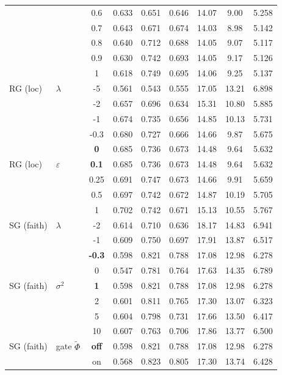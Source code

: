 \begin{longtable}{@{}l l c c c c c c c@{}}
 &  & 0.6 & 0.633 & 0.651 & 0.646 & 14.07 & 9.00 & 5.258 \\
 &  & 0.7 & 0.643 & 0.671 & 0.674 & 14.03 & 8.98 & 5.142 \\
 &  & 0.8 & 0.640 & 0.712 & 0.688 & 14.05 & 9.07 & 5.117 \\
 &  & 0.9 & 0.630 & 0.742 & 0.693 & 14.05 & 9.17 & 5.126 \\
 &  & 1 & 0.618 & 0.749 & 0.695 & 14.06 & 9.25 & 5.137 \\
\midrule
RG (loc) & $\lambda$ & {-}5 & 0.561 & 0.543 & 0.555 & 17.05 & 13.21 & 6.898 \\
 &  & {-}2 & 0.657 & 0.696 & 0.634 & 15.31 & 10.80 & 5.885 \\
 &  & {-}1 & 0.674 & 0.735 & 0.656 & 14.85 & 10.13 & 5.731 \\
 &  & {-}0.3 & 0.680 & 0.727 & 0.666 & 14.66 & 9.87 & 5.675 \\
 &  & \textbf{0} & 0.685 & 0.736 & 0.673 & 14.48 & 9.64 & 5.632 \\
\midrule
RG (loc) & $\varepsilon$ & \textbf{0.1} & 0.685 & 0.736 & 0.673 & 14.48 & 9.64 & 5.632 \\
 &  & 0.25 & 0.691 & 0.747 & 0.673 & 14.66 & 9.91 & 5.659 \\
 &  & 0.5 & 0.697 & 0.742 & 0.672 & 14.87 & 10.19 & 5.705 \\
 &  & 1 & 0.702 & 0.742 & 0.671 & 15.13 & 10.55 & 5.767 \\
\midrule
SG (faith) & $\lambda$ & {-}2 & 0.614 & 0.710 & 0.636 & 18.17 & 14.83 & 6.941 \\
 &  & {-}1 & 0.609 & 0.750 & 0.697 & 17.91 & 13.87 & 6.517 \\
 &  & \textbf{{-}0.3} & 0.598 & 0.821 & 0.788 & 17.08 & 12.98 & 6.278 \\
 &  & 0 & 0.547 & 0.781 & 0.764 & 17.63 & 14.35 & 6.789 \\
\midrule
SG (faith) & $\sigma^2$ & \textbf{1} & 0.598 & 0.821 & 0.788 & 17.08 & 12.98 & 6.278 \\
 &  & 2 & 0.601 & 0.811 & 0.765 & 17.30 & 13.07 & 6.323 \\
 &  & 5 & 0.604 & 0.798 & 0.731 & 17.66 & 13.50 & 6.417 \\
 &  & 10 & 0.607 & 0.763 & 0.706 & 17.86 & 13.77 & 6.500 \\
\midrule
SG (faith) & gate $\tilde\Phi$ & \textbf{off} & 0.598 & 0.821 & 0.788 & 17.08 & 12.98 & 6.278 \\
 &  & on & 0.568 & 0.823 & 0.805 & 17.30 & 13.74 & 6.428 \\

\end{longtable}
